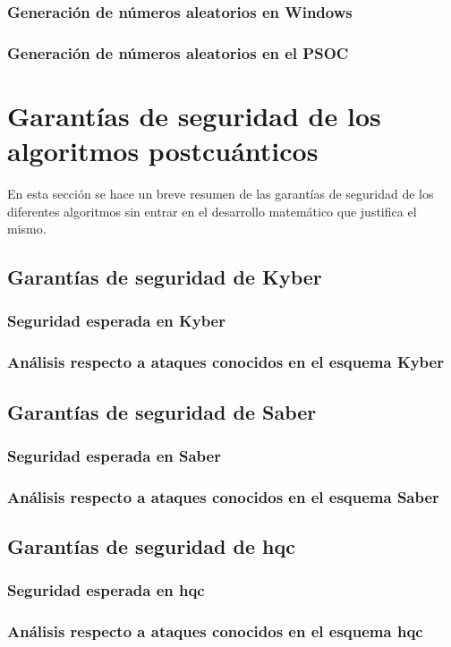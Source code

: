 \subsubsection{Generación de números aleatorios en Windows}
\cite{rngWIN}
\subsubsection{Generación de números aleatorios en el PSOC}
\newpage
\section{Garantías de seguridad de los algoritmos postcuánticos}
En esta sección se hace un breve resumen de las garantías de seguridad de los diferentes algoritmos sin entrar en el desarrollo matemático que justifica el mismo.
\subsection{Garantías de seguridad de Kyber}
\subsubsection{Seguridad esperada en Kyber}
\subsubsection{Análisis respecto a ataques conocidos en el esquema Kyber}
\subsection{Garantías de seguridad de Saber}
\subsubsection{Seguridad esperada en Saber}
\subsubsection{Análisis respecto a ataques conocidos en el esquema Saber}
\subsection{Garantías de seguridad de \acrshort{hqc}}
\subsubsection{Seguridad esperada en \acrshort{hqc}}
\subsubsection{Análisis respecto a ataques conocidos en el esquema \acrshort{hqc}}